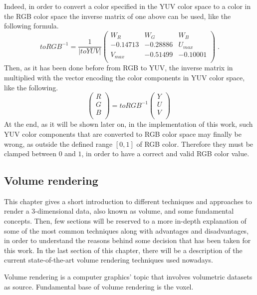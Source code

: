 \documentclass[12pt,a4paper]{extarticle}
\newcommand{\linespace}{\vspace{8pt}}
\begin{document}
Indeed, in order to convert a color specified in the YUV color space to a color in the RGB color space the inverse matrix of one above can be used, like the following formula.
\[
toRGB^{-1} = \frac{1}{|toYUV|}
\begin{pmatrix}
W_{R} & W_{G} & W_{B}\\
-0.14713 & -0.28886 & U_{max}\\
V_{max} & -0.51499& -0.10001\\
\end{pmatrix}
\;.
\]
Then, as it has been done before from RGB to YUV, the inverse matrix in multiplied with the vector encoding the color components in YUV color space, like the following.
\[
\begin{pmatrix}
 R\\
 G\\
 B\\
\end{pmatrix}
=
toRGB^{-1}
\begin{pmatrix}
Y\\
U\\
V\\
\end{pmatrix}
\;
\]
At the end, as it will be shown later on, in the implementation of this work, such YUV color components that are converted to RGB color space may finally be wrong, as outside the defined range $[0,1]$ of RGB color. Therefore they must be clamped between $0$ and $1$, in order to have a correct and valid RGB color value.

\pagebreak
\subsection{Volume rendering} 
This chapter gives a short introduction to different techniques and approaches to render a 3-dimensional data, also known as volume, and some fundamental concepts. Then, few sections will be reserved to a more in-depth explanation of some of the most common techniques along with advantages and disadvantages, in order to understand the reasons behind some decision that has been taken for this work. In the last section of this chapter, there will be a description of the current state-of-the-art volume rendering techniques used nowadays.
\linespace

Volume rendering is a computer graphics' topic that involves volumetric datasets as source. Fundamental base of volume rendering is the voxel. 
\end{document}
